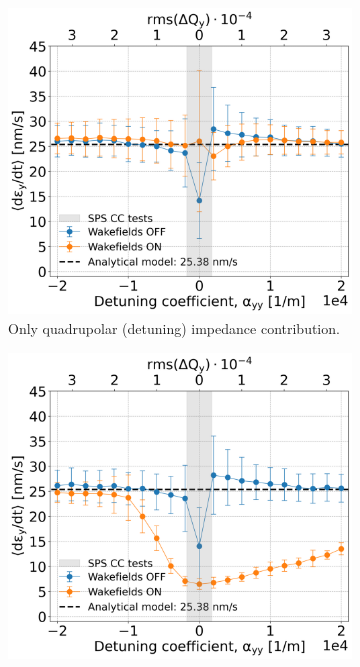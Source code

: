 \begin{figure}[htp]
\begin{subfigure}{.45\textwidth}
        \includegraphics[width=.95\linewidth]{images/Ch7/quadrupolar_impedance.png}
        \caption{Only quadrupolar (detuning) impedance contribution.}
        \label{fig:study_7_quad}
    \end{subfigure}
    \begin{subfigure}{.45\textwidth}
        \centering
        \includegraphics[width=.95\linewidth]{images/Ch7/deyRates_final_2018_PN_sps_270GeV_PN1e-8_400MHz_y-plane_QpxQpy5e-1_6D_Nb5e5_intensity3e10_ayyScan_wakesON_vs_OFF_vs_TuneSpreadvsExpectedSPS.png}  

\end{subfigure}
\end{figure}
